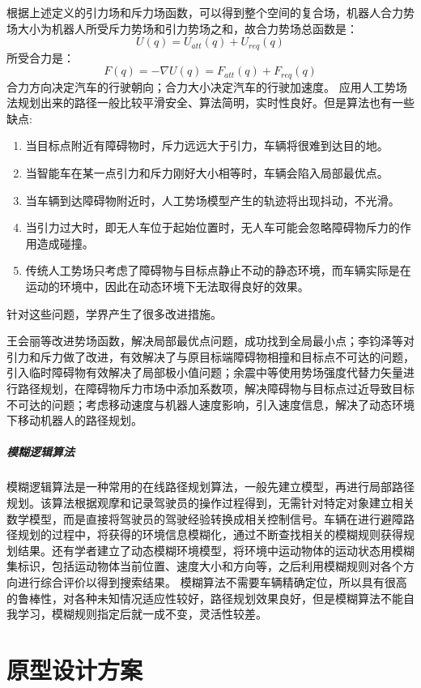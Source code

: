 \documentclass{report}
\begin{document}
根据上述定义的引力场和斥力场函数，可以得到整个空间的复合场，机器人合力势场大小为机器人所受斥力势场和引力势场之和，故合力势场总函数是：
\[ U(q)=U_{att}(q)+U_{req}(q) \]
所受合力是：
\[ F(q)=-\nabla U(q)=F_{att}(q)+F_{req}(q) \]
合力方向决定汽车的行驶朝向；合力大小决定汽车的行驶加速度。
\newpage
应用人工势场法规划出来的路径一般比较平滑安全、算法简明，实时性良好。但是算法也有一些缺点:
\begin{enumerate}
\item 当目标点附近有障碍物时，斥力远远大于引力，车辆将很难到达目的地。
\item 当智能车在某一点引力和斥力刚好大小相等时，车辆会陷入局部最优点。
\item 当车辆到达障碍物附近时，人工势场模型产生的轨迹将出现抖动，不光滑\cite{jh8}。
\item 当引力过大时，即无人车位于起始位置时，无人车可能会忽略障碍物斥力的作用造成碰撞\cite{jh7}。
  \item 传统人工势场只考虑了障碍物与目标点静止不动的静态环境，而车辆实际是在运动的环境中，因此在动态环境下无法取得良好的效果。
\end{enumerate}
针对这些问题，学界产生了很多改进措施。

王会丽等改进势场函数，解决局部最优点问题，成功找到全局最小点；李钧泽等对引力和斥力做了改进，有效解决了与原目标端障碍物相撞和目标点不可达的问题，引入临时障碍物有效解决了局部极小值问题；余震中等使用势场强度代替力矢量进行路径规划，在障碍物斥力市场中添加系数项，解决障碍物与目标点过近导致目标不可达的问题；考虑移动速度与机器人速度影响，引入速度信息，解决了动态环境下移动机器人的路径规划\cite{jh5}。

\paragraph{模糊逻辑算法}

模糊逻辑算法是一种常用的在线路径规划算法，一般先建立模型，再进行局部路径规划。该算法根据观摩和记录驾驶员的操作过程得到，无需针对特定对象建立相关数学模型，而是直接将驾驶员的驾驶经验转换成相关控制信号。车辆在进行避障路径规划的过程中，将获得的环境信息模糊化，通过不断查找相关的模糊规则获得规划结果。还有学者建立了动态模糊环境模型，将环境中运动物体的运动状态用模糊集标识，包括运动物体当前位置、速度大小和方向等，之后利用模糊规则对各个方向进行综合评价以得到搜索结果。
模糊算法不需要车辆精确定位，所以具有很高的鲁棒性，对各种未知情况适应性较好，路径规划效果良好，但是模糊算法不能自我学习，模糊规则指定后就一成不变，灵活性较差\cite{jh6}。

\chapter{原型设计方案}
\end{document}

